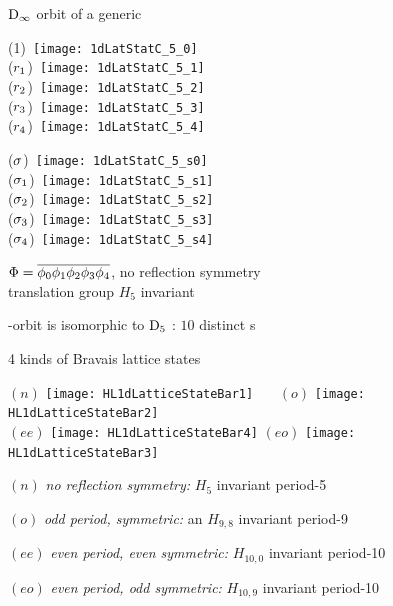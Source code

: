 \begin{frame} {$\textrm{D}_{\infty}$ orbit of a generic {\lattstate}}
\begin{center}
  \begin{minipage}[b]{0.17\textwidth}\begin{center}
{(1)}~\texttt{[image: 1dLatStatC\_5\_0]}
\\
{($r_1$)}~\texttt{[image: 1dLatStatC\_5\_1]}
\\
{($r_2$)}~\texttt{[image: 1dLatStatC\_5\_2]}
\\
{($r_3$)}~\texttt{[image: 1dLatStatC\_5\_3]}
\\
{($r_4$)}~\texttt{[image: 1dLatStatC\_5\_4]}
  \end{center}\end{minipage}
\qquad\quad
  \begin{minipage}[b]{0.17\textwidth}\begin{center}
{($\sigma$)}~\texttt{[image: 1dLatStatC\_5\_s0]}
\\
{($\sigma_1$)}~\texttt{[image: 1dLatStatC\_5\_s1]}
\\
{($\sigma_2$)}~\texttt{[image: 1dLatStatC\_5\_s2]}
\\
{($\sigma_3$)}~\texttt{[image: 1dLatStatC\_5\_s3]}
\\
{($\sigma_4$)}~\texttt{[image: 1dLatStatC\_5\_s4]}

  \end{center} \end{minipage}
  \end{center}
{\lattstate}
\(\Phi={\overline{\phi_0 \phi_1 \phi_2 \phi_3 \phi_4}}\),
no reflection symmetry
\\
 translation group $H_{5}$ invariant

\Dn{\infty}-orbit is isomorphic to $\textrm{D}_{5}$ : $10$ distinct {\lattstate}s
\end{frame} %

\begin{frame} {4 kinds of Bravais lattice states}
\begin{center}
{$(n)$}
\texttt{[image: HL1dLatticeStateBar1]}\quad~~~
{$(o)$}
\texttt{[image: HL1dLatticeStateBar2]}
\\ %
{$(ee)$}
\texttt{[image: HL1dLatticeStateBar4]}\quad
{$(eo)$}
\texttt{[image: HL1dLatticeStateBar3]}
  \end{center}

$(n)$ {\em no reflection symmetry:}
    $H_{5}$ invariant period-5 {\lattstate}

$(o)$ {\em odd period, symmetric:}
    an $H_{9,8}$ invariant period-9

$(ee)$ {\em even period, even symmetric:}
    $H_{10,0}$  invariant period-10

$(eo)$ {\em even period, odd symmetric:}
    $H_{10,9}$  invariant period-10
\end{frame} %

